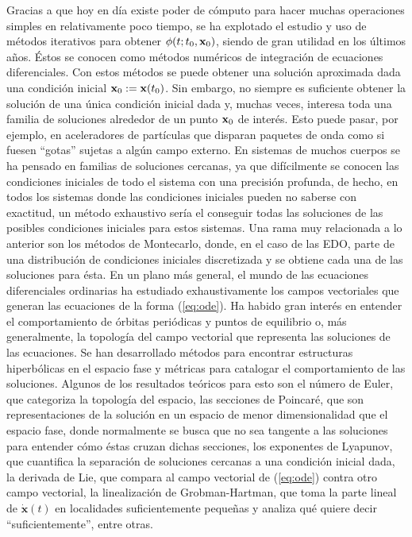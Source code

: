 Gracias a que hoy en día existe poder de cómputo para hacer muchas operaciones simples en relativamente poco tiempo, se ha explotado el estudio y uso de métodos iterativos para obtener $\phi(t;t_0,\mathbf{x}_0)$, siendo de gran utilidad en los últimos años. Éstos se conocen como métodos numéricos de integración de ecuaciones diferenciales. Con estos métodos se puede obtener una solución aproximada dada una condición inicial $\mathbf{x}_0 := \mathbf{x}(t_0)$. Sin embargo, no siempre es suficiente obtener la solución de una única condición inicial dada y, muchas veces, interesa toda una familia de soluciones alrededor de un punto $\mathbf{x}_0$ de interés. Esto puede pasar, por ejemplo, en aceleradores de partículas que disparan paquetes de onda como si fuesen ``gotas'' sujetas a algún campo externo. En sistemas de muchos cuerpos se ha pensado en familias de soluciones cercanas, ya que difícilmente se conocen las condiciones iniciales de todo el sistema con una precisión profunda, de hecho, en todos los sistemas donde las condiciones iniciales pueden no saberse con exactitud, un método exhaustivo sería el conseguir todas las soluciones de las posibles condiciones iniciales para estos sistemas. Una rama muy relacionada a lo anterior son los métodos de Montecarlo, donde, en el caso de las EDO, parte de una distribución de condiciones iniciales discretizada y se obtiene cada una de las soluciones para ésta. 
En un plano más general, el mundo de las ecuaciones diferenciales ordinarias ha estudiado exhaustivamente los campos vectoriales que generan las ecuaciones de la forma (\ref{eq:ode}). Ha habido gran interés en entender el comportamiento de órbitas periódicas y puntos de equilibrio o, más generalmente, la topología del campo vectorial que representa las soluciones de las ecuaciones. Se han desarrollado métodos para encontrar estructuras hiperbólicas en el espacio fase y métricas para catalogar el comportamiento de las soluciones. Algunos de los resultados teóricos para esto son el número de Euler, que categoriza la topología del espacio, las secciones de Poincaré, que son representaciones de la solución en un espacio de menor dimensionalidad que el espacio fase, donde normalmente se busca que no sea tangente a las soluciones para entender cómo éstas cruzan dichas secciones, los exponentes de Lyapunov, que cuantifica la separación de soluciones cercanas a una condición inicial dada, la derivada de Lie, que compara al campo vectorial de (\ref{eq:ode}) contra otro campo vectorial, la linealización de Grobman-Hartman, que toma la parte lineal de $\dot{\mathbf{x}}(t)$ en localidades suficientemente pequeñas y analiza qué quiere decir ``suficientemente'', entre otras. 

